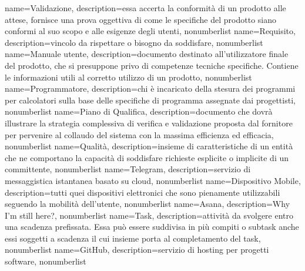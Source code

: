 {
name={Validazione},
description={essa accerta la conformità di un prodotto alle attese, fornisce una prova oggettiva di come le specifiche del prodotto siano conformi al suo scopo e alle esigenze degli utenti},
nonumberlist 
}
{
name={Requisito},
description={vincolo da rispettare o bisogno da soddisfare},
nonumberlist 
}
{
name={Manuale utente},
description={documento destinato all'utilizzatore finale del prodotto, che si presuppone privo di competenze tecniche specifiche. Contiene le informazioni utili al corretto utilizzo di un prodotto},
nonumberlist 
}
{
name={Programmatore},
description={chi è incaricato della stesura dei programmi per calcolatori sulla base delle specifiche di programma assegnate dai progettisti},
nonumberlist 
}
{
name={Piano di Qualifica},
description={documento che dovrà illustrare la strategia complessiva di verifica e validazione proposta dal fornitore per pervenire al collaudo del sistema con la massima efficienza ed efficacia},
nonumberlist 
}
{
name={Qualità},
description={insieme di caratteristiche di un entità che ne comportano la capacità di soddisfare richieste esplicite o implicite di un committente},
nonumberlist 
}
{
name={Telegram},
description={servizio di messaggistica istantanea basato su cloud},
nonumberlist 
}
{
name={Dispositivo Mobile},
description={tutti quei dispositivi elettronici che sono pienamente utilizzabili seguendo la mobilità dell'utente},
nonumberlist 
}
{
name={Asana},
description={Why I'm still here?},
nonumberlist 
}
{
name={Task},
description={attività da svolgere entro una scadenza prefissata. Essa può essere suddivisa in più compiti o subtask anche essi soggetti a scadenza il cui insieme porta al completamento del task},
nonumberlist 
}
{
name={GitHub},
description={servizio di hosting per progetti software},
nonumberlist 
}